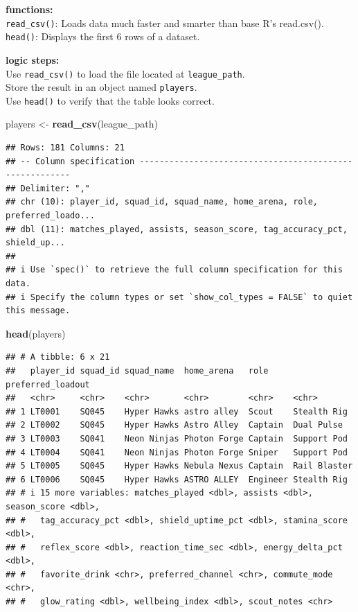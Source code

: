 \documentclass[
]{article}
\newenvironment{Shaded}{\begin{snugshade}}{\end{snugshade}}
\newcommand{\FunctionTok}[1]{\textcolor[rgb]{0.13,0.29,0.53}{\textbf{#1}}}
\newcommand{\NormalTok}[1]{#1}
\newcommand{\OtherTok}[1]{\textcolor[rgb]{0.56,0.35,0.01}{#1}}
\begin{document}
\textbf{functions:}\\
\texttt{read\_csv()}: Loads data much faster and smarter than base R's
read.csv().\\
\texttt{head()}: Displays the first 6 rows of a dataset.

\textbf{logic steps:}\\
Use \texttt{read\_csv()} to load the file located at
\texttt{league\_path}.\\
Store the result in an object named \texttt{players}.\\
Use \texttt{head()} to verify that the table looks correct.

\begin{Shaded}
\begin{Highlighting}[]
\NormalTok{players }\OtherTok{\textless{}{-}} \FunctionTok{read\_csv}\NormalTok{(league\_path)}
\end{Highlighting}
\end{Shaded}

\begin{verbatim}
## Rows: 181 Columns: 21
## -- Column specification --------------------------------------------------------
## Delimiter: ","
## chr (10): player_id, squad_id, squad_name, home_arena, role, preferred_loado...
## dbl (11): matches_played, assists, season_score, tag_accuracy_pct, shield_up...
## 
## i Use `spec()` to retrieve the full column specification for this data.
## i Specify the column types or set `show_col_types = FALSE` to quiet this message.
\end{verbatim}

\begin{Shaded}
\begin{Highlighting}[]
\FunctionTok{head}\NormalTok{(players)}
\end{Highlighting}
\end{Shaded}

\begin{verbatim}
## # A tibble: 6 x 21
##   player_id squad_id squad_name  home_arena   role     preferred_loadout
##   <chr>     <chr>    <chr>       <chr>        <chr>    <chr>            
## 1 LT0001    SQ045    Hyper Hawks astro alley  Scout    Stealth Rig      
## 2 LT0002    SQ045    Hyper Hawks Astro Alley  Captain  Dual Pulse       
## 3 LT0003    SQ041    Neon Ninjas Photon Forge Captain  Support Pod      
## 4 LT0004    SQ041    Neon Ninjas Photon Forge Sniper   Support Pod      
## 5 LT0005    SQ045    Hyper Hawks Nebula Nexus Captain  Rail Blaster     
## 6 LT0006    SQ045    Hyper Hawks ASTRO ALLEY  Engineer Stealth Rig      
## # i 15 more variables: matches_played <dbl>, assists <dbl>, season_score <dbl>,
## #   tag_accuracy_pct <dbl>, shield_uptime_pct <dbl>, stamina_score <dbl>,
## #   reflex_score <dbl>, reaction_time_sec <dbl>, energy_delta_pct <dbl>,
## #   favorite_drink <chr>, preferred_channel <chr>, commute_mode <chr>,
## #   glow_rating <dbl>, wellbeing_index <dbl>, scout_notes <chr>
\end{verbatim}
\end{document}
